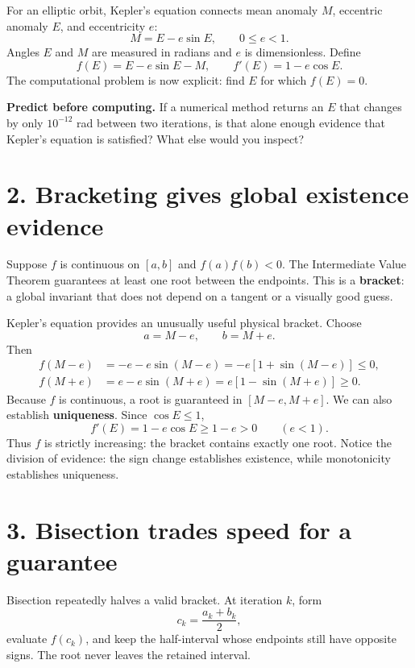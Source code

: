 \documentclass[11pt,a4paper]{article}
\begin{document}
For an elliptic orbit, Kepler's equation connects mean anomaly $M$, eccentric anomaly $E$, and eccentricity $e$:
\begin{equation}
 M=E-e\sin E,\qquad 0\le e<1.
\end{equation}
Angles $E$ and $M$ are measured in radians and $e$ is dimensionless. Define
\begin{equation}
 f(E)=E-e\sin E-M,
 \qquad
 f'(E)=1-e\cos E.
\end{equation}
The computational problem is now explicit: find $E$ for which $f(E)=0$.

\begin{checkbox}
\textbf{Predict before computing.} If a numerical method returns an $E$ that changes by only $10^{-12}$ rad between two iterations, is that alone enough evidence that Kepler's equation is satisfied? What else would you inspect?
\end{checkbox}

\section*{2. Bracketing gives global existence evidence}
Suppose $f$ is continuous on $[a,b]$ and $f(a)f(b)<0$. The Intermediate Value Theorem guarantees at least one root between the endpoints. This is a \textbf{bracket}: a global invariant that does not depend on a tangent or a visually good guess.

Kepler's equation provides an unusually useful physical bracket. Choose
\begin{equation}
 a=M-e,\qquad b=M+e.
\end{equation}
Then
\begin{align}
 f(M-e)&=-e-e\sin(M-e)=-e[1+\sin(M-e)]\le0,\\
 f(M+e)&= e-e\sin(M+e)= e[1-\sin(M+e)]\ge0.
\end{align}
Because $f$ is continuous, a root is guaranteed in $[M-e,M+e]$. We can also establish \textbf{uniqueness}. Since $\cos E\le1$,
\begin{equation}
 f'(E)=1-e\cos E\ge 1-e>0 \qquad (e<1).
\end{equation}
Thus $f$ is strictly increasing: the bracket contains exactly one root. Notice the division of evidence: the sign change establishes existence, while monotonicity establishes uniqueness.

\section*{3. Bisection trades speed for a guarantee}
Bisection repeatedly halves a valid bracket. At iteration $k$, form
\begin{equation}
 c_k=\frac{a_k+b_k}{2},
\end{equation}
evaluate $f(c_k)$, and keep the half-interval whose endpoints still have opposite signs. The root never leaves the retained interval.
\end{document}
